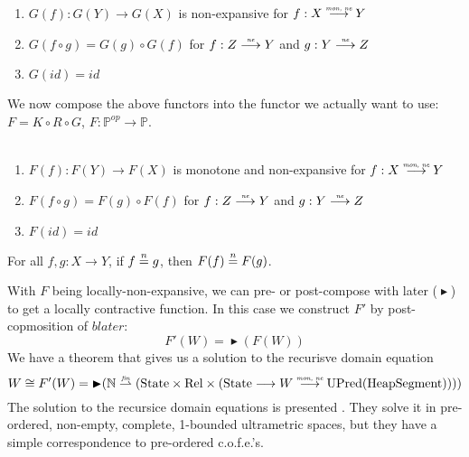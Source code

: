 \documentclass{article}
\newcommand{\forcenewline}{$\phantom{v}$\\}
\newcommand{\finparfun}{\stackrel{\textit{\tiny{fin}}}{\rightharpoonup}}
\newcommand{\monnefun}{\stackrel{\textit{\tiny{mon, ne}}}{\longrightarrow}}
\newcommand{\nefun}{\stackrel{\textit{\tiny{ne}}}{\longrightarrow}}
\newcommand{\fun}{\longrightarrow}
\newcommand{\nequal}[1][n]{\stackrel{\tiny{#1}}{=}}
\newcommand{\blater}{\mathop{\blacktriangleright}}
\newcommand{\id}{\var{id}}
\newcommand{\cofe}{c.o.f.e.}
\newcommand{\cofes}{\cofe{}'s}
\newcommand{\CatP}{\mathbb{P}}
\newcommand{\var}[1]{\mathit{#1}}
\newcommand{\plaindom}[1]{\mathrm{#1}}
\newcommand{\HeapSegments}{\plaindom{HeapSegment}}
\newcommand{\nats}{\mathbb{N}}
\newcommand{\Rel}{\plaindom{Rel}}
\newcommand{\States}{\plaindom{State}}
\newcommand{\UPred}[1]{\plaindom{UPred}(#1)}
\begin{document}
\begin{lemma}[$G$ functorial]\forcenewline
\label{lem:G-func}
  \begin{enumerate}
  \item $G(f) : G(Y) \rightarrow G(X)$ is non-expansive for $f : X \monnefun Y$
  \item $G(f \circ g) = G(g) \circ G(f)$ for $f : Z \nefun Y$ and $g : Y \nefun Z$
  \item $G(\id) = \id$
  \end{enumerate}
\end{lemma}
We now compose the above functors into the functor we actually want to use: $F = K \circ R \circ G$, $F : \CatP^{\var{op}} \rightarrow \CatP$.
\begin{lemma}[$F$ functorial]\forcenewline
\label{lem:F-func}
  \begin{enumerate}
  \item $F(f) : F(Y) \rightarrow F(X)$ is monotone and non-expansive for $f : X \monnefun Y$
  \item $F(f \circ g) = F(g) \circ F(f)$ for $f : Z \nefun Y$ and $g : Y \nefun Z$\
  \item $F(\id) = \id$
  \end{enumerate}
\end{lemma}

\begin{lemma}
\label{lem:F-loc-ne}
For all $f, g : X \fun Y$, if $f \nequal g$, then $F(f) \nequal F(g)$.
\end{lemma}
With $F$ being locally-non-expansive, we can pre- or post-compose with later ($\blater$) to get a locally contractive function. In this case we construct $F'$ by post-copmosition of $blater$:
\[
  F'(W) = \blater (F(W))
\]
We have a theorem that gives us a solution to the recurisve domain equation
\[
  W \cong F'(W) = \blater (\nats \finparfun (\States \times \Rel \times (\States \fun W \monnefun \UPred{\HeapSegments} )))
\]
The solution to the recursice domain equations is presented \cite{Birkedal:2010:TCS:411:4102-4122}. They solve it in pre-ordered, non-empty, complete, 1-bounded ultrametric spaces, but they have a simple correspondence to pre-ordered \cofes{}.
\end{document}

